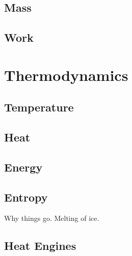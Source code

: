 \documentclass[main.tex]{subfiles}
\begin{document}
\chapter{Mass}
\chapter{Work}
\part{Thermodynamics}
\chapter{Temperature}
\chapter{Heat}
\chapter{Energy}
\chapter{Entropy}
Why things go. Melting of ice.
\chapter{Heat Engines}
\end{document}
